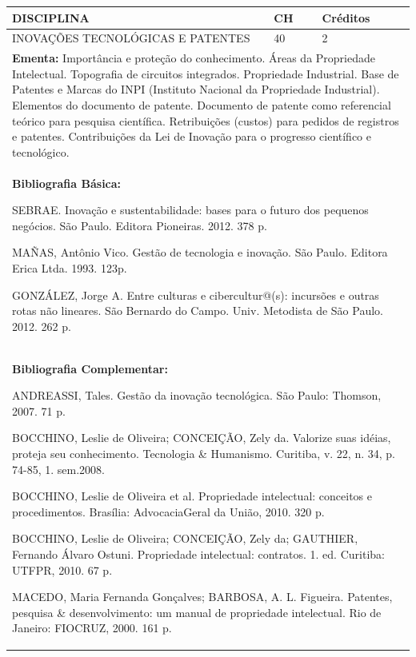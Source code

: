 \documentclass[a4paper, 12pt, openright, oneside, german, french, english, brazil]{abntex2}
\begin{document}
\begin{table}[!h]
  \footnotesize
  \centering
  \begin{tabular}{|p{100mm}|p{10mm}|p{20mm}|}
    \hline
    \textbf{DISCIPLINA} & \textbf{CH} & \textbf{Créditos} \\
    \hline
    INOVAÇÕES TECNOLÓGICAS E PATENTES & 40 & 2 \\
    \hline
    \multicolumn{3}{|p{130mm}|}{\textbf{Ementa:}  Importância e proteção do conhecimento. Áreas da Propriedade Intelectual. Topografia de circuitos integrados. Propriedade Industrial. Base de Patentes e Marcas do INPI (Instituto Nacional da Propriedade Industrial). Elementos do documento de patente. Documento de patente como referencial teórico para pesquisa científica. Retribuições (custos) para pedidos de registros e patentes. Contribuições da Lei de Inovação para o progresso científico e tecnológico.} \\
    \hline
    \multicolumn{3}{|p{130mm}|}{\textbf{Bibliografia Básica:}

    SEBRAE. Inovação e sustentabilidade: bases para o futuro dos pequenos
negócios. São Paulo. Editora Pioneiras. 2012. 378 p.

MAÑAS, Antônio Vico. Gestão de tecnologia e inovação. São Paulo. Editora Erica Ltda.
1993. 123p.

GONZÁLEZ, Jorge A. Entre culturas e cibercultur@(s): incursões e outras rotas não
lineares. São Bernardo do Campo. Univ. Metodista de São Paulo. 2012. 262 p.
} \\
    \hline
    \multicolumn{3}{|p{130mm}|}{\textbf{Bibliografia Complementar:}

    ANDREASSI, Tales. Gestão da inovação tecnológica. São Paulo: Thomson, 2007. 71 p.

BOCCHINO, Leslie de Oliveira; CONCEIÇÃO, Zely da. Valorize suas idéias, proteja seu conhecimento. Tecnologia \& Humanismo. Curitiba, v. 22, n. 34, p. 74-85, 1. sem.2008.

BOCCHINO, Leslie de Oliveira et al. Propriedade intelectual: conceitos e procedimentos. Brasília: AdvocaciaGeral da União, 2010. 320 p.

BOCCHINO, Leslie de Oliveira; CONCEIÇÃO, Zely da; GAUTHIER, Fernando Álvaro Ostuni. Propriedade intelectual: contratos. 1. ed. Curitiba: UTFPR, 2010. 67 p.

MACEDO, Maria Fernanda Gonçalves; BARBOSA, A. L. Figueira. Patentes, pesquisa \& desenvolvimento: um manual de propriedade intelectual. Rio de Janeiro: FIOCRUZ, 2000. 161 p.
} \\
    \hline
  \end{tabular}
\end{table}
\end{document}
